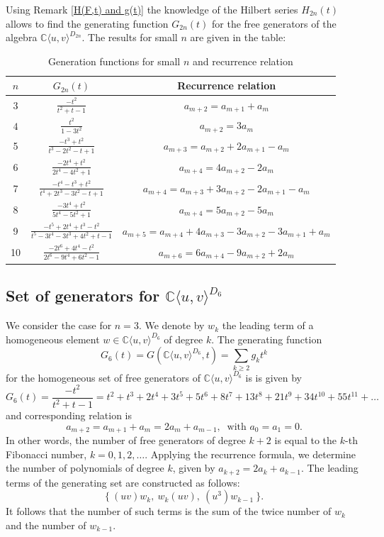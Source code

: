 \documentclass{amsart}[12pt]
\theoremstyle{definition}
\begin{document}
Using Remark \ref{H(F,t) and g(t)} the knowledge of the Hilbert series $H_{2n}(t)$ allows to find the generating function $G_{2n}(t)$
for the free generators of the algebra ${\mathbb C}\langle u,v\rangle^{D_{2n}}$. The results for small $n$ are given in the table:
\begin{table}[h!]
	\centering
	\begin{tabular}{|c|c|c|}
		\hline
		$n$ & $G_{2n}(t)$ & \textbf{Recurrence relation} \\
		\hline \hline
		$3$ & $\frac{-t^2}{t^2+t-1}$ & $a_{m+2} = a_{m+1} + a_m$ \\ [0.2cm]
		\hline
		$4$ & $\frac{t^2}{1-3t^2}$  & $a_{m+2} = 3a_m$ \\ [0.2cm]
		\hline
		5 &  $\frac{-t^3+t^2}{t^3-2t^2-t+1}$& $a_{m+3} = a_{m+2} +2a_{m+1} -a_m$ \\ [0.2cm]
		\hline
		6 & $\frac{ -2t^4+t^2}{2t^4-4t^2+1}$ & $a_{m+4} = 4a_{m+2}- 2a_m$ \\ [0.2cm]
		\hline
		7 &  $\frac{-t^4-t^3+t^2}{t^4+2t^3-3t^2-t+1}$ & $a_{m+4} = a_{m+3} + 3a_{m+2} - 2a_{m+1} - a_m$ \\ [0.2cm]
		\hline
		8 & $\frac{-3t^4+t^2}{5t^4-5t^2+1}$  & $a_{m+4} = 5a_{m+2} - 5a_m$\\ [0.2cm]
		\hline
		9 & $\frac{-t^5+2t^4+t^3-t^2}{t^5-3t^4-3t^3+4t^2+t-1}$   & {\small $a_{m+5} = a_{m+4} + 4a_{m+3} - 3a_{m+2} -3a_{m+1} + a_m$} \\ [0.2cm]
		\hline 	
		10 & $\frac{-2t^6+4t^4-t^2}{2t^6-9t^4+6t^2-1}$  & $a_{m+6} = 6a_{m+4} - 9a_{m+2} + 2a_m$ \\ [0.2cm]
		\hline
	\end{tabular}
	\caption{Generation functions for small $n$ and recurrence relation}
\end{table}

\subsection{Set of generators for ${\mathbb C}\langle u,v\rangle^{D_6}$}

We consider the case for $n=3$.
We denote by $w_k$ the leading term of a homogeneous element $w\in{\mathbb C}\langle u,v\rangle^{D_6}$ of degree $k$.
The generating function
\[
G_6(t)=G({\mathbb C}\langle u,v\rangle^{D_6},t)=\sum_{k\geq 2}g_kt^k
\]
for the homogeneous set of free generators of ${\mathbb C}\langle u,v\rangle^{D_6}$ is
is given by
\[
G_6(t) = \frac{-t^2}{t^2+t-1} = t^2 + t^3 + 2t^4 + 3t^5 + 5t^6 + 8t^7 + 13t^8 + 21t^9 + 34t^{10} + 55t^{11} + \dots 	
\]
and corresponding relation is
\[
a_{m+2} = a_{m+1} + a_m=2a_{m}+a_{m-1}, \ \text{ with } a_0=a_1=0.
\]
In other words, the number of free generators of degree $k+2$ is equal to the $k$-th Fibonacci number, $k=0,1,2,\ldots$.
Applying the recurrence formula, we determine the number of polynomials of degree $k$, given by $a_{k+2}=2a_{k}+a_{k-1}$. The leading terms of the generating set are constructed as follows:
\[
\{ \ (uv)w_{k}, \ w_{k}(uv),\ (u^3 )w_{k-1}\  \}.
\]
It follows that the number of such terms is the sum of the twice number of $w_{k}$ and  the number of $w_{k-1}$.
\end{document}
